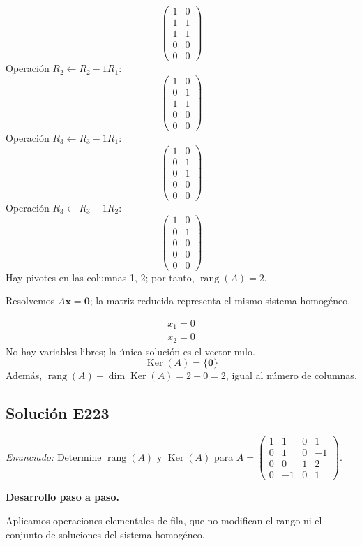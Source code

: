 \documentclass[12pt]{article}
\theoremstyle{remark}
\newcommand{\rang}{\operatorname{rang}}
\newcommand{\Ker}{\operatorname{Ker}}
\newcommand{\vect}[1]{\boldsymbol{#1}}
\newcommand{\solucion}[2]{\Needspace{11\baselineskip}\subsection*{Solución E#1}\noindent\textit{Enunciado:} #2\par\medskip\noindent\textbf{Desarrollo paso a paso.}\par\medskip}
\begin{document}
\[
\begin{pmatrix}1&0\\1&1\\1&1\\0&0\\0&0\end{pmatrix}
\]
Operación $R_{2}\leftarrow R_{2}-1R_{1}$:
\[
\begin{pmatrix}1&0\\0&1\\1&1\\0&0\\0&0\end{pmatrix}
\]
Operación $R_{3}\leftarrow R_{3}-1R_{1}$:
\[
\begin{pmatrix}1&0\\0&1\\0&1\\0&0\\0&0\end{pmatrix}
\]
Operación $R_{3}\leftarrow R_{3}-1R_{2}$:
\[
\begin{pmatrix}1&0\\0&1\\0&0\\0&0\\0&0\end{pmatrix}
\]
Hay pivotes en las columnas 1, 2; por tanto, $\boxed{\rang(A)=2}$.

Resolvemos $A\vect x=\vect0$; la matriz reducida representa el mismo sistema homogéneo.

\[
\begin{aligned}x_{1}=0\\x_{2}=0\end{aligned}
\]
No hay variables libres; la única solución es el vector nulo.
\[
\boxed{\Ker(A)=\{\vect0\}}
\]
Además, $\rang(A)+\dim\Ker(A)=2+0=2$, igual al número de columnas.


\medskip

\solucion{223}{Determine $\rang(A)$ y $\Ker(A)$ para $A=\begin{pmatrix}1&1&0&1\\0&1&0&-1\\0&0&1&2\\0&-1&0&1\end{pmatrix}$.}
Aplicamos operaciones elementales de fila, que no modifican el rango ni el conjunto de soluciones del sistema homogéneo.
\end{document}
